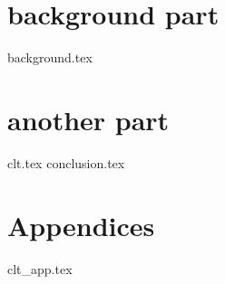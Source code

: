 \documentclass[a4paper,11pt,leqno,openbib,oldfontcommands]{memoir} %
\newcommand{\clearemptydoublepage}{\newpage{\thispagestyle{empty}\cleardoublepage}}
\theoremstyle{plain}
\begin{document}
\part{background part}\label{part:mp}
%
{background.tex}
\clearemptydoublepage
%
\part{another part}\label{part:another}
%
%
{clt.tex}
\clearemptydoublepage
%
{conclusion.tex}
\clearemptydoublepage
%
%
\part*{Appendices}
\label{app:appendices}
\appendix
%
{clt_app.tex}
\clearemptydoublepage
%
\backmatter
% 

% 

\clearemptydoublepage
%
%   
\end{document}
